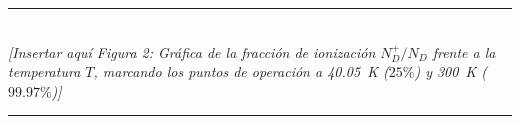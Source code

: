\begin{problema}
\begin{center}
    \rule{0.8\textwidth}{0.4pt} \\[2ex]
    \textit{[Insertar aquí Figura 2: Gráfica de la fracción de ionización $N_D^+/N_D$ frente a la temperatura $T$, marcando los puntos de operación a \SI{40.05}{\kelvin} ($25\%$) y \SI{300}{\kelvin} ($99.97\%$)]} \\[2ex]
    \rule{0.8\textwidth}{0.4pt}
    \label{fig:problema_3_grafica_ionizacion}
\end{center}
\end{problema}

